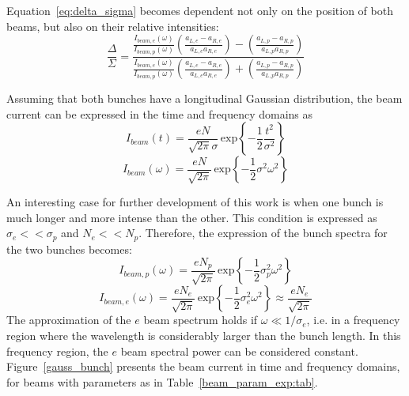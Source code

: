 Equation~\ref{eq:delta_sigma} becomes dependent not only on the position of both beams, but also on their relative intensities:
\begin{equation}
\frac{\Delta}{\Sigma} = \frac{
\frac{I_{beam,e}(\omega)}{I_{beam,p}(\omega)} \left(\frac{a_{L,e} - a_{R,e}}{a_{L,e} a_{R,e}}\right) - \left(\frac{a_{L,p} - a_{R,p}}{a_{L,p} a_{R,p}}\right)
}{
\frac{I_{beam,e}(\omega)}{I_{beam,p}(\omega)} \left(\frac{a_{L,e} - a_{R,e}}{a_{L,e} a_{R,e}}\right) + \left(\frac{a_{L,p} - a_{R,p}}{a_{L,p} a_{R,p}}\right)
}\label{eq:delta_sigma2}
\end{equation}

Assuming that both bunches have a longitudinal Gaussian distribution, the beam current can be expressed in the time and frequency domains as
\begin{equation}
I_{beam}(t) = \frac{e N}{\sqrt{2\pi} \sigma} \,\text{exp}\left\{  -\frac{1}{2}\frac{t^2}{\sigma^2}  \right\}\label{eq:gauss_bunch}
\end{equation}
\begin{equation}
I_{beam}(\omega) = \frac{e N}{\sqrt{2\pi}} \,\text{exp}\left\{  -\frac{1}{2} \sigma^2 \omega^2  \right\}
\end{equation}

An interesting case for further development of this work is when one bunch is much longer and more intense than the other. This condition is expressed as $\sigma_e << \sigma_p$ and $N_e << N_p$. Therefore, the expression of the bunch spectra for the two bunches becomes:
\begin{equation}
I_{beam,p}(\omega) = \frac{e N_p}{\sqrt{2\pi}} \,\text{exp}\left\{  -\frac{1}{2} \sigma_p^2 \omega^2  \right\}\label{eq:pPower}
\end{equation}
\begin{equation}
I_{beam,e}(\omega) = \frac{e N_e}{\sqrt{2\pi}} \,\text{exp}\left\{  -\frac{1}{2} \sigma_e^2 \omega^2  \right\} \approx \frac{e N_e}{\sqrt{2\pi}}\label{eq:ePower}
\end{equation}
The approximation of the $e$ beam spectrum holds if $\omega \ll 1/\sigma_e$, i.e. in a frequency region where the wavelength is considerably larger than the bunch length. In this frequency region, the $e$ beam spectral power can be considered constant. Figure~\ref{gauss_bunch} presents the beam current in time and frequency domains, for beams with parameters as in Table~\ref{beam_param_exp:tab}.


